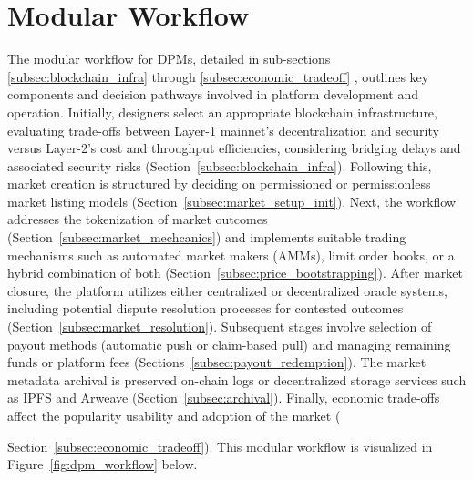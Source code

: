 
\section{Modular Workflow}
 
The modular workflow for DPMs, detailed in sub-sections \ref{subsec:blockchain_infra} through \ref{subsec:economic_tradeoff} , outlines key components and decision pathways involved in platform development and operation. Initially, designers select an appropriate blockchain infrastructure, evaluating trade-offs between Layer-1 mainnet's decentralization and security versus Layer-2's cost and throughput efficiencies, considering bridging delays and associated security risks (Section~\ref{subsec:blockchain_infra}). Following this, market creation is structured by deciding on permissioned or permissionless market listing models (Section~\ref{subsec:market_setup_init}). Next, the workflow addresses the tokenization of market outcomes (Section~\ref{subsec:market_mechcanics}) and implements suitable trading mechanisms such as automated market makers (AMMs), limit order books, or a hybrid combination of both (Section~\ref{subsec:price_bootstrapping}). After market closure, the platform utilizes either centralized or decentralized oracle systems, including potential dispute resolution processes for contested outcomes (Section~\ref{subsec:market_resolution}). Subsequent stages involve selection of payout methods (automatic push or claim-based pull) and managing remaining funds or platform fees (Sections~\ref{subsec:payout_redemption}). The market metadata archival is preserved on-chain logs or decentralized storage services such as IPFS and Arweave (Section~\ref{subsec:archival}). Finally, economic trade-offs affect the popularity usability and adoption of the market ({Section~\ref{subsec:economic_tradeoff}). This modular workflow is visualized in Figure~\ref{fig:dpm_workflow} below.

}
